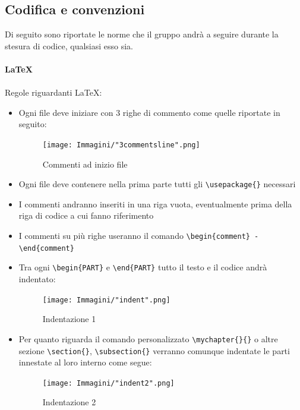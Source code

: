 \documentclass[a4paper]{report}
\newcommand{\mychapter}[2]{
	\setcounter{chapter}{#1}
	\setcounter{section}{0}
	\setcounter{subsection}{1}
	\chapter*{#2}
	\addcontentsline{toc}{chapter}{#2}
}
\begin{document}
	\subsection{Codifica e convenzioni}
	Di seguito sono riportate le norme che il gruppo andrà a seguire durante la stesura di codice, qualsiasi esso sia.
	\\ \\
	\textbf{\LaTeX} \\ \\ 
	Regole riguardanti \LaTeX :
	\begin{itemize}
		\item Ogni file deve iniziare con 3 righe di commento come quelle riportate in seguito:
		\begin{figure}[h!]
			\centering
			\texttt{[image: Immagini/"3commentsline".png]}
			\caption{Commenti ad inizio file}
		\end{figure}
		\item Ogni file deve contenere nella prima parte tutti gli \verb|\usepackage{}| necessari
		\item I commenti andranno inseriti in una riga vuota, eventualmente prima della riga di codice a cui fanno riferimento
		\item I commenti su più righe useranno il comando \verb|\begin{comment} - \end{comment}|
		\item Tra ogni \verb|\begin{PART}| e \verb|\end{PART}| tutto il testo e il codice andrà indentato:
		\begin{figure}[h!]
			\centering
			\texttt{[image: Immagini/"indent".png]}
			\caption{Indentazione 1}
		\end{figure}
		\item Per quanto riguarda il comando personalizzato \verb|\mychapter{}{}| o altre sezione \verb|\section{}|, \verb|\subsection{}| 
		verranno comunque indentate le parti innestate al loro interno come segue:
		\begin{figure}[h!]
			\centering
			\texttt{[image: Immagini/"indent2".png]}
			\caption{Indentazione 2}

\end{figure}
\end{itemize}
\end{document}
